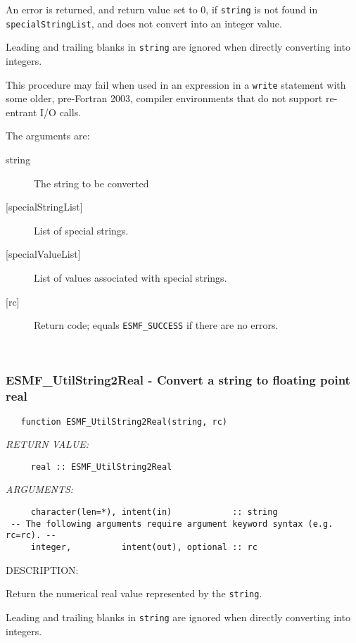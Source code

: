      An error is returned, and return value set to 0, if {\tt string} is not
     found in {\tt specialStringList}, and does not convert into an integer
     value.
  
     Leading and trailing blanks in {\tt string} are ignored when directly
     converting into integers.
  
     This procedure may fail when used in an expression in a {\tt write} statement
     with some older, pre-Fortran 2003, compiler environments that do not support
     re-entrant I/O calls.
  
     The arguments are:
     \begin{description}
     \item[string]
       The string to be converted
     \item[{[specialStringList]}]
       List of special strings.
     \item[{[specialValueList]}]
       List of values associated with special strings.
     \item[{[rc]}]
       Return code; equals {\tt ESMF\_SUCCESS} if there are no errors.
     \end{description}
   
 
\mbox{}\hrulefill\ 
 
\subsubsection [ESMF\_UtilString2Real] {ESMF\_UtilString2Real - Convert a string to floating point real}


\begin{verbatim}   function ESMF_UtilString2Real(string, rc)\end{verbatim}{\em RETURN VALUE:}
\begin{verbatim}     real :: ESMF_UtilString2Real\end{verbatim}{\em ARGUMENTS:}
\begin{verbatim}     character(len=*), intent(in)            :: string
 -- The following arguments require argument keyword syntax (e.g. rc=rc). --
     integer,          intent(out), optional :: rc\end{verbatim}
{\sf DESCRIPTION:\\ }


     Return the numerical real value represented by the {\tt string}.
  
     Leading and trailing blanks in {\tt string} are ignored when directly
     converting into integers.
  

